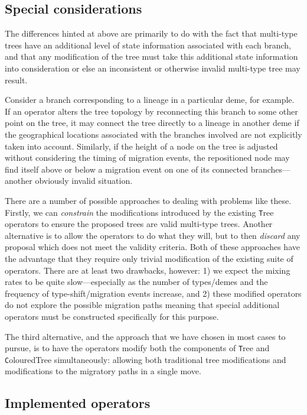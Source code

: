 \documentclass[a4paper,11pt]{article}
\newcommand{\class}[1]{{\texttt #1}}
\begin{document}
\subsection{Special considerations}

The differences hinted at above are primarily to do with the fact that
multi-type trees have an additional level of state information
associated with each branch, and that any modification of the tree
must take this additional state information into consideration or else
an inconsistent or otherwise invalid multi-type tree may result.

Consider a branch corresponding to a lineage in a particular deme, for
example. If an operator alters the tree topology by reconnecting this
branch to some other point on the tree, it may connect the tree
directly to a lineage in another deme if the geographical locations
associated with the branches involved are not explicitly taken into
account.  Similarly, if the height of a node on the tree is adjusted
without considering the timing of migration events, the repositioned
node may find itself above or below a migration event on one of its
connected branches---another obviously invalid situation.

There are a number of possible approaches to dealing with problems
like these.  Firstly, we can \emph{constrain} the modifications
introduced by the existing \class{Tree} operators to ensure the
proposed trees are valid multi-type trees.  Another alternative is to
allow the operators to do what they will, but to then \emph{discard}
any proposal which does not meet the validity criteria. Both of these
approaches have the advantage that they require only trivial
modification of the existing suite of operators.  There are at least
two drawbacks, however: 1) we expect the mixing rates to be quite
slow---especially as the number of types/demes and the frequency of
type-shift/migration events increase, and 2) these modified operators
do not explore the possible migration paths meaning that special
additional operators must be constructed specifically for this purpose.

The third alternative, and the approach that we have chosen in most
cases to pursue, is to have the operators modify both the components
of \class{Tree} and \class{ColouredTree} simultaneously: allowing both
traditional tree modifications and modifications to the migratory
paths in a single move.

\subsection{Implemented operators}
\end{document}
